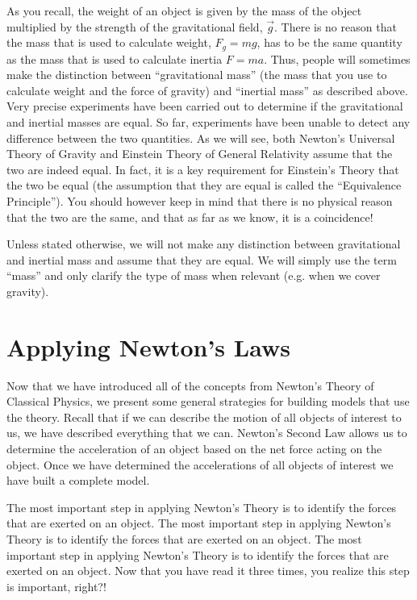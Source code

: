 As you recall, the weight of an object is given by the mass of the object multiplied by the strength of the gravitational field, $\vec g$. There is no reason that the mass that is used to calculate weight, $F_g=mg$, has to be the same quantity as the mass that is used to calculate inertia $F=ma$. Thus, people will sometimes make the distinction between ``gravitational mass'' (the mass that you use to calculate weight and the force of gravity) and ``inertial mass'' as described above. Very precise experiments have been carried out to determine if the gravitational and inertial masses are equal. So far, experiments have been unable to detect any difference between the two quantities. As we will see, both Newton's Universal Theory of Gravity and Einstein Theory of General Relativity assume that the two are indeed equal. In fact, it is a key requirement for Einstein's Theory that the two be equal (the assumption that they are equal is called the ``Equivalence Principle''). You should however keep in mind that there is no physical reason that the two are the same, and that as far as we know, it is a coincidence!

Unless stated otherwise, we will not make any distinction between gravitational and inertial mass and assume that they are equal. We will simply use the term ``mass'' and only clarify the type of mass when relevant (e.g. when we cover gravity).

\section{Applying Newton's Laws}
Now that we have introduced all of the concepts from Newton's Theory of Classical Physics, we present some general strategies for building models that use the theory. Recall that if we can describe the motion of all objects of interest to us, we have described everything that we can. Newton's Second Law allows us to determine the acceleration of an object based on the net force acting on the object. Once we have determined the accelerations of all objects of interest we have built a complete model. 

The most important step in applying Newton's Theory is to identify the forces that are exerted on an object. The most important step in applying Newton's Theory is to identify the forces that are exerted on an object. The most important step in applying Newton's Theory is to identify the forces that are exerted on an object. Now that you have read it three times, you realize this step is important, right?!


